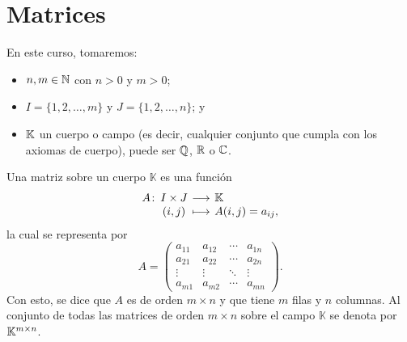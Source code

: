 \documentclass[a4,11pt]{aleph-notas}
\begin{document}
\encabezado

\vspace*{-10mm}
\tableofcontents

\section{Matrices}

En este curso, tomaremos:
\begin{itemize}
    \item
        $n,m\in \N$ con $n>0$ y $m>0$;
    \item 
        $I = \{ 1, 2, \ldots, m\}$ y $J =  \{1, 2 , \ldots, n \}$; y
    \item 
        $\K$ un cuerpo o campo (es decir, cualquier conjunto que cumpla con los axiomas de cuerpo), puede ser $\Q$, $\R$ o $\C$.
\end{itemize}

\begin{defi}[Matriz]
    Una matriz sobre un cuerpo $\mathbb{K}$ es una función 
    \[
        \funcion{A}{I\times J}{\mathbb{K}}
        {(i,j)}{A(i,j)=a_{ij},}
    \]
    la cual se representa por
    \[
        A = 
        \begin{pmatrix}
        a_{11} & a_{12} & \cdots & a_{1n} \\ 
        a_{21} & a_{22} & \cdots & a_{2n} \\ 
        \vdots & \vdots & \ddots & \vdots\\ 
        a_{m1} & a_{m2} & \cdots & a_{mn}
        \end{pmatrix}.
    \]
    Con esto, se dice que $A$ es de orden $m \times n$ y que tiene $m$ filas y $n$ columnas. Al conjunto de todas las matrices de orden $m \times n$ sobre el campo $\mathbb{K}$ se denota por $\Mat[\K]{m}{n}$.
\end{defi}



\end{document}
